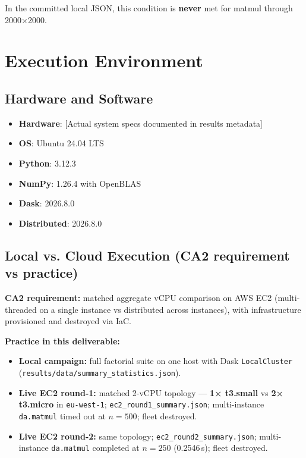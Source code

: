 In the committed local JSON, this condition is \textbf{never} met for matmul through 2000×2000.

\section{Execution Environment}

\subsection{Hardware and Software}

\begin{itemize}
    \item \textbf{Hardware}: [Actual system specs documented in results metadata]
    \item \textbf{OS}: Ubuntu 24.04 LTS
    \item \textbf{Python}: 3.12.3
    \item \textbf{NumPy}: 1.26.4 with OpenBLAS
    \item \textbf{Dask}: 2026.8.0
    \item \textbf{Distributed}: 2026.8.0
\end{itemize}

\subsection{Local vs. Cloud Execution (CA2 requirement vs practice)}

\textbf{CA2 requirement:} matched aggregate vCPU comparison on AWS EC2 (multi-threaded on a single instance vs distributed across instances), with infrastructure provisioned and destroyed via IaC.

\textbf{Practice in this deliverable:}
\begin{itemize}
    \item \textbf{Local campaign:} full factorial suite on one host with Dask \texttt{LocalCluster} (\texttt{results/data/summary\_statistics.json}).
    \item \textbf{Live EC2 round-1:} matched 2-vCPU topology — \textbf{1× t3.small} vs \textbf{2× t3.micro} in \texttt{eu-west-1}; \texttt{ec2\_round1\_summary.json}; multi-instance \texttt{da.matmul} timed out at $n{=}500$; fleet destroyed.
    \item \textbf{Live EC2 round-2:} same topology; \texttt{ec2\_round2\_summary.json}; multi-instance \texttt{da.matmul} completed at $n{=}250$ (0.2546\,s); fleet destroyed.
\end{itemize}

